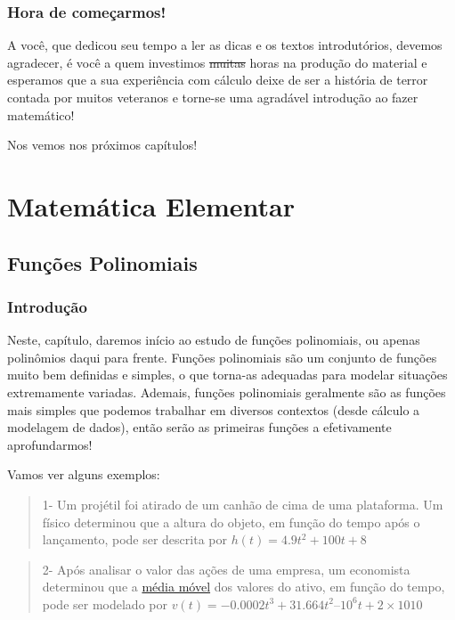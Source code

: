 \documentclass[
  letterpaper,
  DIV=11,
  numbers=noendperiod]{scrreprt}
\begin{document}
\section{Hora de começarmos!}\label{hora-de-comeuxe7armos}

A você, que dedicou seu tempo a ler as dicas e os textos introdutórios,
devemos agradecer, é você a quem investimos \st{muitas} horas na
produção do material e esperamos que a sua experiência com cálculo deixe
de ser a história de terror contada por muitos veteranos e torne-se uma
agradável introdução ao fazer matemático!

Nos vemos nos próximos capítulos! 🤩

\part{Matemática Elementar}

\chapter{Funções Polinomiais}\label{funuxe7uxf5es-polinomiais}

\section{Introdução}\label{introduuxe7uxe3o-1}

Neste, capítulo, daremos início ao estudo de funções polinomiais, ou
apenas polinômios daqui para frente. Funções polinomiais são um conjunto
de funções muito bem definidas e simples, o que torna-as adequadas para
modelar situações extremamente variadas. Ademais, funções polinomiais
geralmente são as funções mais simples que podemos trabalhar em diversos
contextos (desde cálculo a modelagem de dados), então serão as primeiras
funções a efetivamente aprofundarmos!

Vamos ver alguns exemplos:

\begin{quote}
1- Um projétil foi atirado de um canhão de cima de uma plataforma. Um
físico determinou que a altura do objeto, em função do tempo após o
lançamento, pode ser descrita por \(h(t) = 4.9t^2+100t+8\)
\end{quote}

\begin{quote}
2- Após analisar o valor das ações de uma empresa, um economista
determinou que a \href{https://pt.wikipedia.org/wiki/Média_móvel}{média
móvel} dos valores do ativo, em função do tempo, pode ser modelado por
\(v(t) = −0.0002t^3+31.664t^2–10^6t+2×1010\)
\end{quote}
\end{document}

